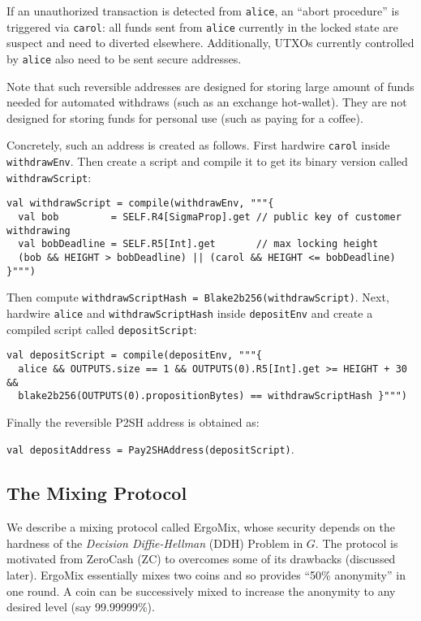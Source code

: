 \documentclass[11pt]{article}
\newcommand{\mixname}{ErgoMix\xspace}
\begin{document}
If an unauthorized transaction is detected from \texttt{alice}, an ``abort procedure'' is triggered via \texttt{carol}: all funds sent from \texttt{alice} currently in the locked state are suspect and need to diverted elsewhere. Additionally, UTXOs currently controlled by \texttt{alice} also need to be sent secure addresses. 

Note that such reversible addresses are designed for storing large amount of funds needed for automated withdraws (such as an exchange hot-wallet). They are not designed for storing funds for personal use (such as paying for a coffee).

Concretely, such an address is created as follows. First hardwire \texttt{carol} inside \texttt{withdrawEnv}. Then create a script and compile it to get its binary version called \texttt{withdrawScript}:
\begin{verbatim}
val withdrawScript = compile(withdrawEnv, """{
  val bob         = SELF.R4[SigmaProp].get // public key of customer withdrawing
  val bobDeadline = SELF.R5[Int].get       // max locking height
  (bob && HEIGHT > bobDeadline) || (carol && HEIGHT <= bobDeadline) }""")
\end{verbatim}

Then compute \texttt{withdrawScriptHash = Blake2b256(withdrawScript)}. Next, hardwire \texttt{alice} and \texttt{withdrawScriptHash} inside \texttt{depositEnv} and create a compiled script called \texttt{depositScript}:

\begin{verbatim}
val depositScript = compile(depositEnv, """{ 
  alice && OUTPUTS.size == 1 && OUTPUTS(0).R5[Int].get >= HEIGHT + 30 &&
  blake2b256(OUTPUTS(0).propositionBytes) == withdrawScriptHash }""")
\end{verbatim}

Finally the reversible P2SH address is obtained as:

 \texttt{val depositAddress = Pay2SHAddress(depositScript)}.

\subsection{The Mixing Protocol}

We describe a mixing protocol called \mixname, whose security depends on the hardness of the {\em Decision Diffie-Hellman} (DDH) Problem in $G$. The protocol is motivated from ZeroCash (ZC) to overcomes some of its drawbacks (discussed later). 
\mixname essentially mixes two coins and so provides ``50\% anonymity'' in one round. A coin can be successively mixed to increase the anonymity to any desired level (say 99.99999\%). 
\end{document}
